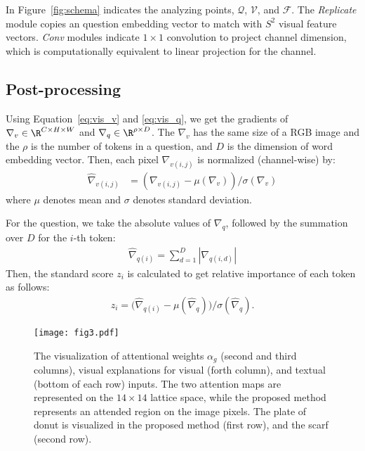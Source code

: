 \documentclass{article}
\begin{document}
In Figure~\ref{fig:schema} indicates the analyzing points, $\mathcal{Q}$, $\mathcal{V}$, and $\mathcal{F}$. The \textit{Replicate} module copies an question embedding vector to match with $S^2$ visual feature vectors. \textit{Conv} modules indicate $1 \times 1$ convolution to project channel dimension, which is computationally equivalent to linear projection for the channel.

\subsection{Post-processing}

Using Equation~\ref{eq:vis_v} and \ref{eq:vis_q}, we get the gradients of $\nabla_v \in \R^{C \times H \times W}$ and $\nabla_q \in \R^{\rho \times D}$. The $\nabla_v$ has the same size of a RGB image and the $\rho$ is the number of tokens in a question, and $D$ is the dimension of word embedding vector. Then, each pixel $\nabla_{v(i,j)}$ is normalized (channel-wise) by:\begin{align} 
  \hat{\nabla}_{v(i,j)} &= (\nabla_{v(i,j)} - \mu(\nabla_{v})) / \sigma(\nabla_{v})
\end{align}
where $\mu$ denotes mean and $\sigma$ denotes standard deviation. 

For the question, we take the absolute values of $\nabla_{q}$, followed by the summation over $D$ for the $i$-th token:
\begin{align}
  \hat{\nabla}_{q(i)} = \sum_{d=1}^D |\nabla_{q(i,d)}|
\end{align}
Then, the standard score $z_i$ is calculated to get relative importance of each token as follows: \begin{align}
  z_i = \big( \hat{\nabla}_{q(i)} - \mu(\hat{\nabla}_{q}) \big) / \sigma(\hat{\nabla}_{q}).
\end{align}

\begin{figure}[ht]
  \centering
  \texttt{[image: fig3.pdf]}
  \caption{The visualization of attentional weights $\alpha_g$ (second and third columns), visual explanations for visual (forth column), and textual (bottom of each row) inputs. The two attention maps are represented on the $14 \times 14$ lattice space, while the proposed method represents an attended region on the image pixels. The plate of donut is visualized in the proposed method (first row), and the scarf (second row).}
  \label{fig:vis}
\end{figure}
\end{document}
